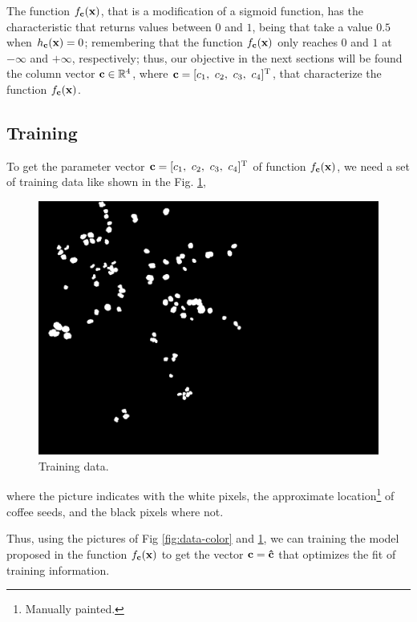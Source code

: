 The function $f_{\VECTOR{c}}(\VECTOR{x})$, that is a modification of a sigmoid function,
has the characteristic that returns values between $0$ and $1$,
being that take a value $0.5$ when $h_{\VECTOR{c}}(\VECTOR{x})=0$;
remembering that the function $f_{\VECTOR{c}}(\VECTOR{x})$ only reaches $0$ and $1$ at $-\infty$ and $+\infty$,
respectively;
thus, our objective in the next sections will be found the column vector $\VECTOR{c}\in \mathbb{R}^{4}$,
where $\VECTOR{c}=[c_1,~ c_2,~ c_3,~ c_4]^{\transpose}$, that characterize the function $f_{\VECTOR{c}}(\VECTOR{x})$.

\subsection{Training}

To get the parameter vector $\VECTOR{c}=[c_1,~ c_2,~ c_3,~ c_4]^{\transpose}$
of function $f_{\VECTOR{c}}(\VECTOR{x})$, 
we need a set of training data like shown in the Fig. \ref{fig:data-trainning-bw},
\begin{figure}[h!]
\centering
\includegraphics[width=0.99\linewidth]{IMG_0225-BW.png}
\caption{Training data.}
\label{fig:data-trainning-bw}
\end{figure} 
where the picture indicates with the white pixels, the approximate 
location\footnote{Manually painted.} of coffee seeds,
and the black pixels where not. 

Thus, using the pictures of Fig \ref{fig:data-color} and \ref{fig:data-trainning-bw},
we can training the model proposed in the function $f_{\VECTOR{c}}(\VECTOR{x})$
to get the vector $\VECTOR{c}=\VECTOR{\hat{c}}$
that optimizes the fit of training information.


